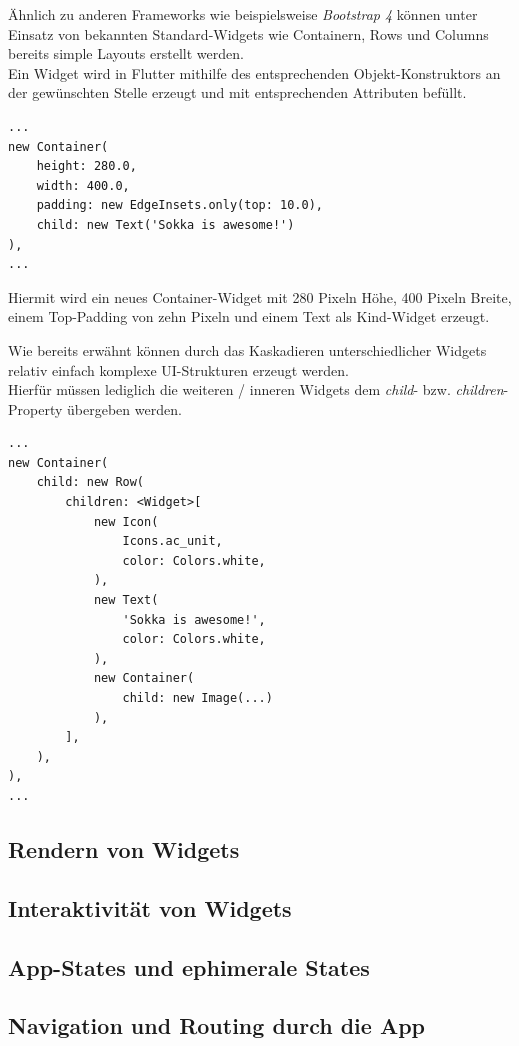 Ähnlich zu anderen Frameworks wie beispielsweise \textit{Bootstrap 4}
können unter Einsatz von bekannten Standard-Widgets wie Containern, Rows und Columns
bereits simple Layouts erstellt werden.\\

Ein Widget wird in Flutter mithilfe des entsprechenden Objekt-Konstruktors
an der gewünschten Stelle erzeugt und mit entsprechenden Attributen befüllt.

\begin{lstlisting}
...
new Container(
    height: 280.0,
    width: 400.0,
    padding: new EdgeInsets.only(top: 10.0),
    child: new Text('Sokka is awesome!')
),
...
\end{lstlisting}

Hiermit wird ein neues Container-Widget mit 280 Pixeln Höhe,
400 Pixeln Breite, einem Top-Padding von zehn Pixeln und einem Text als
Kind-Widget erzeugt.

Wie bereits erwähnt können durch das Kaskadieren unterschiedlicher Widgets
relativ einfach komplexe UI-Strukturen erzeugt werden.\\
Hierfür müssen lediglich die weiteren / inneren Widgets dem 
\textit{child}- bzw. \textit{children}- Property übergeben werden.
\pagebreak
\begin{lstlisting}
...
new Container(
    child: new Row(
        children: <Widget>[
            new Icon(
                Icons.ac_unit,
                color: Colors.white,
            ),
            new Text(
                'Sokka is awesome!',
                color: Colors.white,
            ),
            new Container(
                child: new Image(...)
            ),
        ],
    ),
),
...
\end{lstlisting}


\subsection{Rendern von Widgets}

\subsection{Interaktivität von Widgets}

\subsection{App-States und ephimerale States}

\subsection{Navigation und Routing durch die App}













